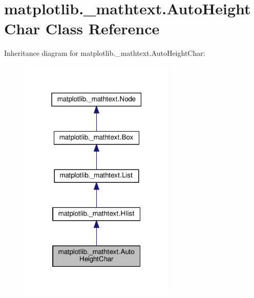 \hypertarget{classmatplotlib_1_1__mathtext_1_1AutoHeightChar}{}\section{matplotlib.\+\_\+mathtext.\+Auto\+Height\+Char Class Reference}
\label{classmatplotlib_1_1__mathtext_1_1AutoHeightChar}


Inheritance diagram for matplotlib.\+\_\+mathtext.\+Auto\+Height\+Char\+:
\nopagebreak
\begin{figure}[H]
\begin{center}
\leavevmode
\includegraphics[width=211pt]{classmatplotlib_1_1__mathtext_1_1AutoHeightChar__inherit__graph}
\end{center}
\end{figure}


